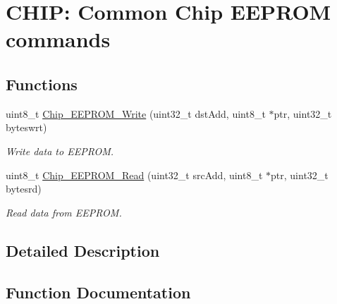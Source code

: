 \hypertarget{group___c_o_m_m_o_n___e_e_p_r_o_m}{}\section{C\+H\+IP\+: Common Chip E\+E\+P\+R\+OM commands}
\label{group___c_o_m_m_o_n___e_e_p_r_o_m}
\subsection*{Functions}
\begin{DoxyCompactItemize}
\item 
uint8\+\_\+t \hyperlink{group___c_o_m_m_o_n___e_e_p_r_o_m_gad6f8a672d415b0b1a33d02f83926413d}{Chip\+\_\+\+E\+E\+P\+R\+O\+M\+\_\+\+Write} (uint32\+\_\+t dst\+Add, uint8\+\_\+t $\ast$ptr, uint32\+\_\+t byteswrt)
\begin{DoxyCompactList}\small\item\em Write data to E\+E\+P\+R\+OM. \end{DoxyCompactList}\item 
uint8\+\_\+t \hyperlink{group___c_o_m_m_o_n___e_e_p_r_o_m_gab445a8d7640f7f5332c78171995f8d32}{Chip\+\_\+\+E\+E\+P\+R\+O\+M\+\_\+\+Read} (uint32\+\_\+t src\+Add, uint8\+\_\+t $\ast$ptr, uint32\+\_\+t bytesrd)
\begin{DoxyCompactList}\small\item\em Read data from E\+E\+P\+R\+OM. \end{DoxyCompactList}\end{DoxyCompactItemize}


\subsection{Detailed Description}


\subsection{Function Documentation}
\mbox{\label{group___c_o_m_m_o_n___e_e_p_r_o_m_gab445a8d7640f7f5332c78171995f8d32}} 
